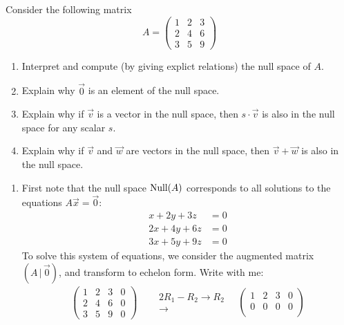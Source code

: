 \documentclass{ximera}
\begin{document}
\begin{example}
  Consider the following matrix
  \[
    A = \begin{pmatrix}
      1 & 2 & 3 \\
      2 & 4 & 6 \\
      3 & 5 & 9
    \end{pmatrix}
  \]
  \begin{enumerate}
    \item Interpret and compute (by giving explict relations) the null space
          of $A$.
    \item Explain why $\vec{0}$ is an element of the null space.
    \item Explain why if $\vec{v}$ is a vector in the null space, then $s\cdot
            \vec{v}$ is also in the null space for any scalar $s$.
    \item Explain why if $\vec{v}$ and $\vec{w}$ are vectors in the null space,
          then $\vec{v} + \vec{w}$ is also in the null space.
  \end{enumerate}
  \begin{explanation}
    \begin{enumerate}
    \item First note that the null space $\operatorname{Null}(A)$ corresponds to all
      solutions to the equations $A\vec{x} = \vec{0}$:
      \begin{align*}
        x + 2y + 3z  & = 0 \\
        2x +4y + 6z  & = 0 \\
        3x + 5y + 9z & =0
      \end{align*}
      To solve this system of equations, we consider the augmented matrix
      $(A\,|\,\vec{0})$, and transform to echelon form. Write with me:
      \begin{align*}
        \begin{pmatrix}
          1 & 2 & 3 & 0 \\
          2 & 4 & 6 & 0 \\
          3 & 5 & 9 & 0
        \end{pmatrix}
        & \quad
        \begin{matrix}
          \scriptstyle 2R_1-R_2\rightarrow R_2 \\
          \longrightarrow
        \end{matrix}
        \quad
        \begin{pmatrix}
          1 & 2 & 3 & 0 \\
          0 & 0 & 0 & 0 \\

\end{pmatrix}
\end{align*}
\end{enumerate}
\end{explanation}
\end{example}
\end{document}

